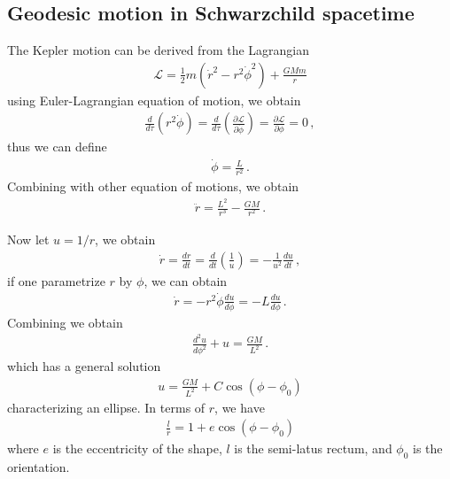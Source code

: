 \documentclass[11pt, onesided]{book}
\theoremstyle{break}
\theoremstyle{break}
\newcommand{\pd}{\partial}
\begin{document}
\subsection{Geodesic motion in Schwarzchild spacetime}
The Kepler motion can be derived from the Lagrangian
\begin{align*}
\mathcal{L} = \frac{1}{2}m\left( \dot{r}^2 - r^2 \dot{\phi}^2 \right)+ \frac{GMm}{r}
\end{align*}
using Euler-Lagrangian equation of motion, we obtain
\begin{align*}
\frac{d}{d\tau}(r^2 \dot{\phi}) = \frac{d}{d\tau}\left( \frac{\pd \mathcal{L}}{\pd \dot{\phi}}\right) = \frac{\pd \mathcal{L}}{\pd \phi} = 0\,,
\end{align*}
thus we can define 
\begin{align*}
\dot{\phi} = \frac{L}{r^2}\,.
\end{align*}
Combining with other equation of motions, we obtain
\begin{align*}
\ddot{r} = \frac{L^2}{r^3}  -\frac{GM}{r^2}\,.
\end{align*}

Now let $u = 1/r$, we obtain
\begin{align*}
\dot{r} = \frac{dr}{dt} = \frac{d}{dt}\left( \frac{1}{u}\right) = -\frac{1}{u^2} \frac{du}{dt}\,,
\end{align*}
if one parametrize $r$ by $\phi$, we can obtain
\begin{align*}
\dot{r} = -r^2 \dot{\phi}\frac{du}{d\phi} = -L \frac{du}{d\phi}\,.
\end{align*}
Combining we obtain
\begin{align*}
\frac{d^2 u}{d\phi^2} + u = \frac{GM}{L^2}\,.
\end{align*}
which has a general solution
\begin{align*}
u = \frac{GM}{L^2} + C\cos(\phi - \phi_0)
\end{align*}
characterizing an ellipse. In terms of $r$, we have
\begin{align*}
\frac{l}{r} = 1+ e\cos(\phi - \phi_0)
\end{align*}
where $e$ is the eccentricity of the shape, $l$ is the semi-latus rectum, and $\phi_0$ is the orientation. \\
\end{document}
